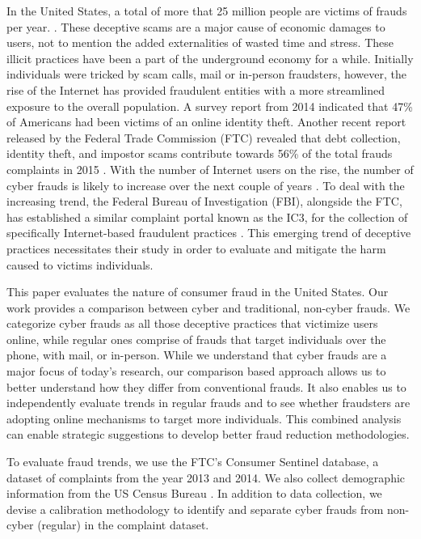 \documentclass[conference]{IEEEtran}
\begin{document}
In the United States, a total of more that 25 million people are victims of frauds per year. \cite{anderson2013consumer}. These deceptive scams are a major cause of economic damages to users, not to mention the added externalities of wasted time and stress. These illicit practices have been a part of the underground economy for a while. Initially individuals were tricked by scam calls, mail or in-person fraudsters, however, the rise of the Internet has provided fraudulent entities with a more streamlined exposure to the overall population. A  survey report from 2014 indicated that 47\% of Americans had been victims of an online identity theft. Another recent report released by the  Federal Trade Commission (FTC) revealed that debt collection, identity theft, and impostor scams contribute towards 56\% of the total frauds complaints in 2015 \cite{ftcpress2016} . With the number of Internet users on the rise, the number of cyber frauds is likely to increase over the next couple of years \cite{perharassment}. To deal with the increasing trend, the Federal Bureau of Investigation (FBI), alongside the FTC, has established a similar complaint portal known as the IC3, for the collection of specifically Internet-based fraudulent practices \cite{fbiic3}. This emerging trend of deceptive practices necessitates their study in order to evaluate and mitigate the harm caused to victims individuals.

This paper evaluates the nature of consumer fraud in the United States. Our work provides a comparison between cyber and traditional, non-cyber frauds. We categorize cyber frauds as all those deceptive practices that victimize users online, while regular ones comprise of frauds that target individuals over the phone, with mail, or in-person. While we understand that cyber frauds are a major focus of today's research, our comparison based approach allows us to better understand how they differ from conventional frauds. It also enables us to independently evaluate trends in regular frauds and to see whether fraudsters are adopting online mechanisms to target more individuals. This combined analysis can enable strategic suggestions to develop better fraud reduction methodologies.

To evaluate fraud trends, we use the FTC's Consumer Sentinel database, a dataset of complaints from the year 2013 and 2014. We also collect demographic information from the US Census Bureau \cite{uscensus}. In addition to data collection, we devise a calibration methodology to identify and separate cyber frauds from non-cyber (regular) in the complaint dataset. 
\end{document}
